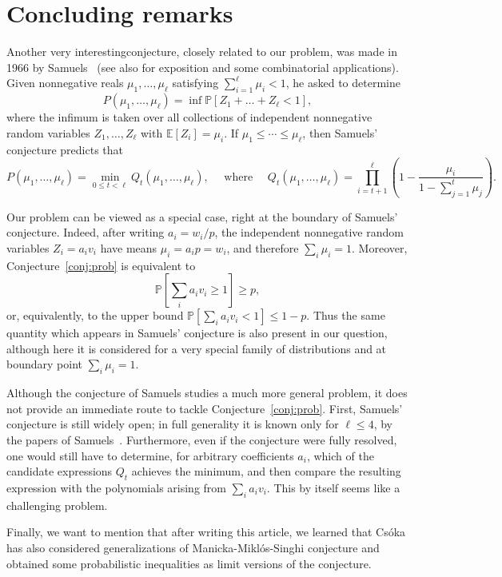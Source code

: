 \documentclass[11pt]{amsart}
\theoremstyle{definition}
\def\bE{\mathbb{E}}
\def\Pb{\mathbb{P}}
\begin{document}
\section{Concluding remarks}

Another very interestingconjecture, closely related to our problem, was made in 1966 by Samuels~\cite{Sam66} (see also \cite{AFHRRS12} for exposition and some combinatorial applications). Given nonnegative reals $\mu_1, \dots, \mu_\ell$ satisfying $\sum_{i=1}^{\ell}\mu_i<1$, he asked to determine
\[
  P(\mu_1,\dots,\mu_\ell)=\inf \Pb[Z_1+\dots+Z_\ell<1],
\]
where the infimum is taken over all collections of independent nonnegative random variables $Z_1, \dots, Z_\ell$ with $\bE[Z_i]=\mu_i$. If $\mu_1\leq \cdots \leq \mu_\ell$, then Samuels' conjecture predicts that
\[
  P(\mu_1,\dots,\mu_\ell)=\min_{0\leq t<\ell} Q_t(\mu_1,
  \dots,\mu_\ell),\quad \text{ where }\quad 
  Q_t(\mu_1,\dots,\mu_\ell)=\prod_{i=t+1}^{\ell}
  \left(1-\frac{\mu_i}{1-\sum_{j=1}^t\mu_j}\right).
\]

Our problem can be viewed as a special case, right at the boundary of Samuels' conjecture. Indeed, after writing $a_i=w_i/p$, the independent nonnegative random variables $Z_i=a_i v_i$ have means $\mu_i=a_i p=w_i$, and therefore $\sum_i \mu_i=1$. Moreover, Conjecture~\ref{conj:prob} is equivalent to
\[
  \Pb\left[\sum_i a_i v_i\geq 1\right]\geq p,
\]
or, equivalently, to the upper bound $\Pb[\sum_i a_i v_i<1]\leq 1-p$. Thus the same quantity which appears in Samuels' conjecture is also present in our question, although here it is considered for a very special family of distributions and at boundary point $\sum_i\mu_i=1$.

Although the conjecture of Samuels studies a much more general problem, it does not provide an immediate route to tackle Conjecture~\ref{conj:prob}. First, Samuels' conjecture is still widely open; in full generality it is known only for $\ell\leq 4$, by the papers of Samuels~\cite{Sam66,Sam68}. Furthermore, even if the conjecture were fully resolved, one would still have to determine, for arbitrary coefficients $a_i$, which of the candidate expressions $Q_t$ achieves the minimum, and then compare the resulting expression with the polynomials arising from $\sum_i a_i v_i$. This by itself seems like a challenging problem.

Finally, we want to mention that after writing this article, we learned that Cs\'oka \cite{Csoka} has also considered generalizations of Manicka-Mikl\'os-Singhi conjecture and obtained some probabilistic inequalities as limit versions of the conjecture.
\end{document}
